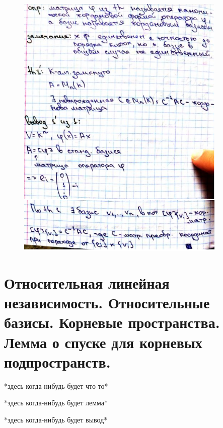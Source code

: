 \documentclass[algebra]{subfiles}
\begin{document}
      \begin{figure}[H]
              \includegraphics[width=10cm]{pics/58}
              \centering
      \end{figure}

    \section{Относительная линейная независимость. Относительные базисы. Корневые пространства. Лемма о спуске для корневых подпространств.}

    *здесь когда-нибудь будет что-то*

    \begin{lemma}[1]
      *здесь когда-нибудь будет лемма*
    \end{lemma}

    *здесь когда-нибудь будет вывод*
\end{document}
